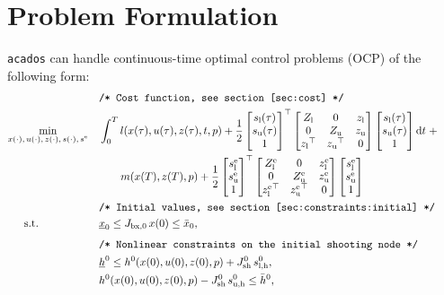 \documentclass[english]{article}
\newcommand{\acados}{\texttt{acados}}
\newcommand{\tran}{^\top}
\newcommand{\ind}[1]{_{\textrm{#1}}}
\newcommand{\terminal}{^{\textrm{e}}}
\newcommand{\initial}{^{\textrm{0}}}
\newcommand{\matr}[1]{\begin{bmatrix}#1\end{bmatrix}}
\newcommand{\Lower}{\ind{l}}
\newcommand{\lowerh}{\ind{l,h}}
\newcommand{\upper}{\ind{u}}
\newcommand{\mathComment}[1]{\texttt{/* #1 */}}
\begin{document}
%
\section{Problem Formulation}\label{sec:problem}
%
\acados{} can handle continuous-time optimal control problems (OCP) of the following form:
%
\begin{align}
    &&&\mathComment{Cost function, see section \ref{sec:cost}}\nonumber\\
    &\underset{\begin{subarray}{c}
        x(\cdot),\,u(\cdot), \, z(\cdot), \, s(\cdot), \, s\terminal
        \end{subarray}}{\min}
    &&\int_0^T l(x(\tau), u(\tau), z(\tau), t, p)
     + \frac{1}{2} \matr{s\Lower(\tau) \\ s\upper(\tau) \\ 1} \tran
      \matr{ Z\Lower & 0 & z\Lower \\
      0 & Z\upper & z\upper \\
        {z\Lower}\tran & {z\upper}\tran & 0}
    \matr{s\Lower(\tau) \\ s\upper(\tau) \\ 1} \mathrm{d}t \; + \nonumber\\
     &&& \quad \quad m(x(T), z(T), p) +
      \frac{1}{2} \matr{s\Lower\terminal \\ s\upper\terminal \\ 1} \tran
     \matr{ Z\Lower\terminal & 0 & z\Lower\terminal \\
         0 & Z\upper\terminal & z\upper\terminal \\
         {z\Lower\terminal}\tran & {z\upper\terminal}\tran & 0}
     \matr{s\Lower\terminal \\ s\upper\terminal \\ 1}
     \label{eq:cost}\\
    &&&\mathComment{Initial values, see section \ref{sec:constraints:initial}}\nonumber\\
    &\,\,\,\quad \text{s.t.}    &&\underline{x}_0 \leq J_{\textrm{bx},0} \, x(0) \leq \bar{x}_0 , && \label{eq:constraints:initial}\\[1ex]
    &&&\mathComment{Nonlinear constraints on the initial shooting node} \nonumber\\
    &&&\underline{h}\initial \leq h\initial(x(0), u(0), z(0), p) + J_{\textrm{sh}}\initial \, s\lowerh\initial, &&\label{eq:constraints:path:lower_bounds:start}\\
    &&& h\initial(x(0), u(0),  z(0), p) - J\ind{sh}\initial\, s\ind{u,h}\initial \leq \bar{h}\initial, &&\label{eq:constraints:path:upper_bounds:start}\\

\end{align}
\end{document}
